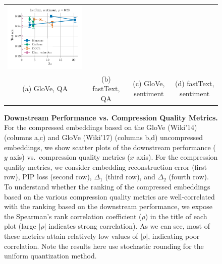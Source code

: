 \begin{figure}
\begin{tabular}{@{\hskip -0.0in}c@{\hskip -0.0in}c@{\hskip -0.0in}c@{\hskip -0.0in}c@{\hskip -0.0in}}
		\includegraphics[width=.245\linewidth]{figures/fasttext1m_sentiment_sst_test-acc_vs_gram-large-dim-delta2-2_linx_stoc.pdf} \\
		(a) GloVe, QA & (b) fastText, QA  & (c) GloVe, sentiment & (d) fastText, sentiment
	\end{tabular}
	\caption{
		\textbf{Downstream Performance vs. Compression Quality Metrics.}
		For the compressed embeddings based on the GloVe (Wiki'14) (columns a,c) and GloVe (Wiki'17) (columns b,d) uncompressed embeddings, we show scatter plots of the downstream performance ($y$ axis) vs.\ compression quality metrics ($x$ axis).
		For the compression quality metrics, we consider embedding reconstruction error (first row), PIP loss (second row), $\Delta_1$ (third row), and $\Delta_2$ (fourth row).
		To understand whether the ranking of the compressed embeddings based on the various compression quality metrics are well-correlated with the ranking based on the downstream performance, we expose the Spearman's rank correlation coefficient ($\rho$) in the title of each plot (large $|\rho|$ indicates strong correlation).
		As we can see, most of these metrics attain relatively low values of $|\rho|$, indicating poor correlation. Note the results here use stochastic rounding for the uniform quantization method.}
	\label{fig:bad_correlation_stoc}
\end{figure}

